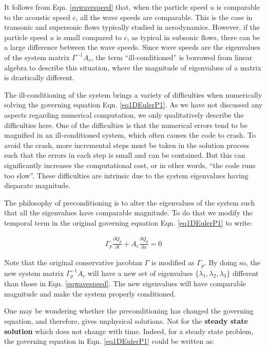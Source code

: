 \documentclass[12pt, letterpaper]{report}
\begin{document}
It follows from Eqn. \ref{eqwavespeed} that, when the particle speed $u$ is comparable to the
acoustic speed $c$, all the wave speeds are comparable. This is the case in transonic and supersonic
flows typically studied in aerodynamics. However, if the particle speed $u$ is small compared to
$c$, as typical in subsonic flows, there can be a large difference between the wave speeds. Since
wave speeds are the eigenvalues of the system matrix $\Gamma^{-1}A_c$, the term ``ill-conditioned''
is borrowed from linear algebra to describe this situation, where the magnitude of eigenvalues of
a matrix is drastically different. \paraspace

The ill-conditioning of the system brings a variety of difficulties when numerically solving the
governing equation Eqn. \ref{eq1DEulerP1}. As we have not discussed any aspects regarding
numerical computation, we only qualitatively describe the difficulties here. One of the difficulties
is that the numerical errors tend to be magnified in an ill-conditioned system, which often
causes the code to crash. To avoid the crash, more incremental steps must be taken in the solution
process such that the errors in each step is small and can be contained. But this can significantly
increases the computational cost, or in other words, ``the code runs too slow''. These difficulties
are intrinsic due to the system eigenvalues having disparate magnitude. \paraspace

The philosophy of preconditioning is to alter the eigenvalues of the system such that all the
eigenvalues have comparable magnitude. To do that we modify the temporal term in the original
governing equation Eqn. \ref{eq1DEulerP1} to write:

\begin{align*}
   \Gamma_p \frac{\partial Q_p}{\partial t} + A_c \frac{\partial Q_p}{\partial x} = 0
\end{align*}

Note that the original conservative jacobian $\Gamma$ is modified as $\Gamma_p$. By doing so, the
new system matrix $\Gamma_p^{-1}A_c$ will have a new set of eigenvalues $\{\lambda_1, \lambda_2,
\lambda_3\}$ different than those in Eqn. \ref{eqwavespeed}. The new eigenvalues will have
comparable magnitude and make the system properly conditioned. \paraspace

One may be wondering whether the preconditioning has changed the governing equation, and therefore,
gives unphysical solutions. Not for the {\bf steady state solution} which does not change with time.
Indeed, for a steady state problem, the governing equation in Eqn. \ref{eq1DEulerP1} could be
written as:
\end{document}
